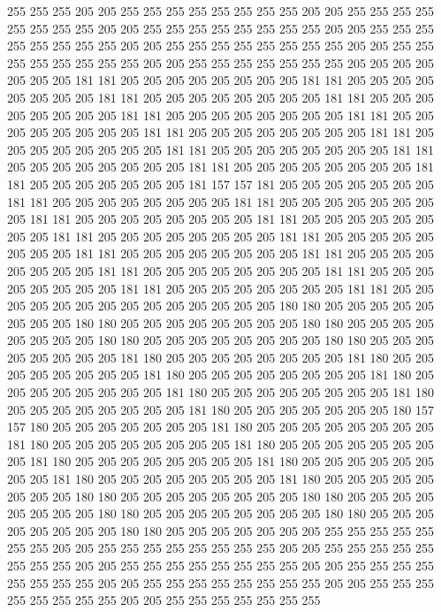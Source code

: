 255 255 255 205 205 255 255 255 255 255 255 255 255 205 205 255 255 255 255 255
255 255 255 205 205 255 255 255 255 255 255 255 255 205 205 255 255 255 255 255
255 255 255 205 205 255 255 255 255 255 255 255 255 205 205 255 255 255 255 255
255 255 255 205 205 255 255 255 255 255 255 255 205 205 205 205 205 205 205 181
181 205 205 205 205 205 205 205 205 181 181 205 205 205 205 205 205 205 205 181
181 205 205 205 205 205 205 205 205 181 181 205 205 205 205 205 205 205 205 181
181 205 205 205 205 205 205 205 205 181 181 205 205 205 205 205 205 205 205 181
181 205 205 205 205 205 205 205 205 181 181 205 205 205 205 205 205 205 205 181
181 205 205 205 205 205 205 205 205 181 181 205 205 205 205 205 205 205 205 181
181 205 205 205 205 205 205 205 205 181 181 205 205 205 205 205 205 205 181 157
157 181 205 205 205 205 205 205 205 181 181 205 205 205 205 205 205 205 205 181
181 205 205 205 205 205 205 205 205 181 181 205 205 205 205 205 205 205 205 181
181 205 205 205 205 205 205 205 205 181 181 205 205 205 205 205 205 205 205 181
181 205 205 205 205 205 205 205 205 181 181 205 205 205 205 205 205 205 205 181
181 205 205 205 205 205 205 205 205 181 181 205 205 205 205 205 205 205 205 181
181 205 205 205 205 205 205 205 205 181 181 205 205 205 205 205 205 205 205 181
181 205 205 205 205 205 205 205 205 205 205 205 205 205 205 180 180 205 205 205
205 205 205 205 205 180 180 205 205 205 205 205 205 205 205 180 180 205 205 205
205 205 205 205 205 180 180 205 205 205 205 205 205 205 205 180 180 205 205 205
205 205 205 205 205 181 180 205 205 205 205 205 205 205 205 181 180 205 205 205
205 205 205 205 205 181 180 205 205 205 205 205 205 205 205 181 180 205 205 205
205 205 205 205 205 181 180 205 205 205 205 205 205 205 205 181 180 205 205 205
205 205 205 205 205 181 180 205 205 205 205 205 205 205 180 157 157 180 205 205
205 205 205 205 205 181 180 205 205 205 205 205 205 205 205 181 180 205 205 205
205 205 205 205 205 181 180 205 205 205 205 205 205 205 205 181 180 205 205 205
205 205 205 205 205 181 180 205 205 205 205 205 205 205 205 181 180 205 205 205
205 205 205 205 205 181 180 205 205 205 205 205 205 205 205 180 180 205 205 205
205 205 205 205 205 180 180 205 205 205 205 205 205 205 205 180 180 205 205 205
205 205 205 205 205 180 180 205 205 205 205 205 205 205 205 180 180 205 205 205
205 205 205 205 255 255 255 255 255 255 255 205 205 255 255 255 255 255 255 255
255 205 205 255 255 255 255 255 255 255 255 205 205 255 255 255 255 255 255 255
255 205 205 255 255 255 255 255 255 255 255 205 205 255 255 255 255 255 255 255
255 205 205 255 255 255 255 255 255 255 255 205 205 255 255 255 255 255 255 255
